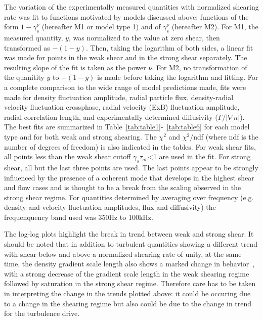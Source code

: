 \documentclass[aip,pop,amsmath,amssymb,preprint,superscriptaddress]{revtex4-1} %
\begin{document}
The variation of the experimentally measured quantities with normalized shearing rate  was fit to functions motivated by models discussed above: functions of the form $1-\gamma_{s}^{\nu}$ (hereafter M1 or model type 1) and of $\gamma_{s}^{\nu}$ (hereafter M2). For M1, the measured quantity, $y$, was normalized to the value at zero shear, then transformed as $-(1-y)$. Then, taking the logarithm of both sides, a linear fit was made for points in the weak shear and in the strong shear separately. The resulting slope of the fit is taken as the power $\nu$. For M2, no transformation of the quanitity $y$ to $-(1-y)$ is made before taking the logarithm and fitting. For a complete comparison to the wide range of model predictions made, fits were made for density fluctuation amplitude, radial particle flux, density-radial velocity fluctuation crossphase, radial velocity (ExB) fluctuation amplitude, radial correlation length, and experimentally determined diffusivity ($\Gamma/|\nabla n|$). The best fits are summarized in Table~\ref{tab:table1}-~\ref{tab:table6} for each model type and for both weak and strong shearing. The $\chi^{2}$ and $\chi^{2}/$ndf (where ndf is the number of degrees of freedom) is also indicated in the tables.  For weak shear fits, all points less than the weak shear cutoff $\gamma_{s}\tau_{ac}$<1 are used in the fit. For strong shear, all but the last three points are used. The last points appear to be strongly influenced by the presence of a coherent mode that develops in the highest shear and flow cases and is thought to be a break from the scaling observed in the strong shear regime. For quantities determined by averaging over frequency (e.g. density and velocity fluctuation amplitudes, flux and diffusivity) the frequenquency band used was 350Hz to 100kHz.

The log-log plots highlight the break in trend between weak and strong shear. It should be noted that in addition to turbulent quantities showing a different trend with shear below and above a normalized shearing rate of unity, at the same time, the density gradient scale length also shows a marked change in behavior~\cite{schaffner12}, with a strong decrease of the gradient scale length in the weak shearing regime followed by saturation in the strong shear regime. Therefore care has to be taken in interpreting the change in the trends plotted above: it could be occuring due to a change in the shearing regime but also could be due to the change in trend for the turbulence drive.
\end{document}
